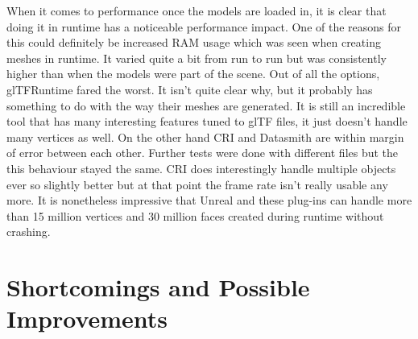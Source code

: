 When it comes to performance once the models are loaded in, it is clear that doing it in runtime has a noticeable performance impact. One of the reasons for this could definitely be increased RAM usage which was seen when creating meshes in runtime. It varied quite a bit from run to run but was consistently higher than when the models were part of the scene. Out of all the options, glTFRuntime fared the worst. It isn't quite clear why, but it probably has something  to do with the way their meshes are generated. It is still an incredible tool that has many interesting features tuned to glTF files, it just doesn't handle many vertices as well. On the other hand CRI and Datasmith are within margin of error between each other. Further tests were done with different files but the this behaviour stayed the same. CRI does interestingly handle multiple objects ever so slightly better but at that point the frame rate isn't really usable any more. It is nonetheless impressive that Unreal and these plug-ins can handle more than 15 million vertices and 30 million faces created during runtime without crashing. 

\section{Shortcomings and Possible Improvements}

